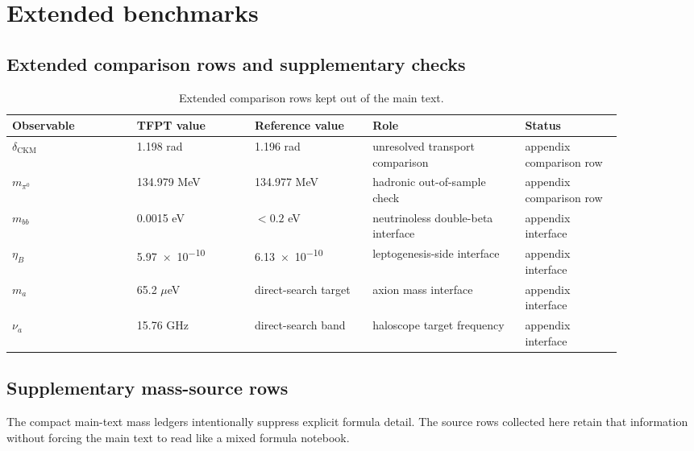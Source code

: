 \documentclass[11pt,a4paper]{article}
\theoremstyle{definition}
\theoremstyle{remark}
\begin{document}
\section{Extended benchmarks}
\label{app:benchmarks}

\subsection{Extended comparison rows and supplementary checks}

\begin{table}[H]
\centering
\scriptsize
\begin{tabularx}{\linewidth}{@{}>{\raggedright\arraybackslash}p{0.18\linewidth}>{\raggedleft\arraybackslash}p{0.17\linewidth}>{\raggedleft\arraybackslash}p{0.17\linewidth}>{\raggedright\arraybackslash}p{0.22\linewidth}>{\raggedright\arraybackslash}p{0.14\linewidth}@{}}
\toprule
Observable & TFPT value & Reference value & Role & Status \\
\midrule
$\delta_{\mathrm{CKM}}$ & \num{1.198} rad & \num{1.196} rad & unresolved transport comparison & appendix comparison row \\
$m_{\pi^0}$ & \num{134.979} MeV & \num{134.977} MeV & hadronic out-of-sample check & appendix comparison row \\
$m_{bb}$ & \num{0.0015} eV & $< \num{0.2}$ eV & neutrinoless double-beta interface & appendix interface \\
$\eta_B$ & \num{5.97e-10} & \num{6.13e-10} & leptogenesis-side interface & appendix interface \\
$m_a$ & \num{65.2} $\mu$eV & direct-search target & axion mass interface & appendix interface \\
$\nu_a$ & \num{15.76} GHz & direct-search band & haloscope target frequency & appendix interface \\
\bottomrule
\end{tabularx}
\caption{Extended comparison rows kept out of the main text.}
\label{tab:extended-benchmarks}
\end{table}

\subsection{Supplementary mass-source rows}

The compact main-text mass ledgers intentionally suppress explicit formula detail. The source rows collected here retain that information without forcing the main text to read like a mixed formula notebook.
\end{document}
